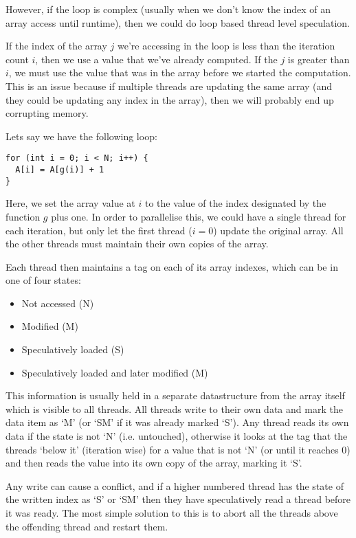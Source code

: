 However, if the loop is complex (usually when we don't know the index
of an array access until runtime), then we could do loop based thread
level speculation.

If the index of the array $j$ we're accessing in the loop is less than
the iteration count $i$, then we use a value that we've already
computed. If the $j$ is greater than $i$, we must use the value that
was in the array before we started the computation. This is an issue
because if multiple threads are updating the same array (and they
could be updating any index in the array), then we will probably end
up corrupting memory.

Lets say we have the following loop:

\begin{verbatim}
for (int i = 0; i < N; i++) {
  A[i] = A[g(i)] + 1
}
\end{verbatim}

Here, we set the array value at $i$ to the value of the index
designated by the function $g$ plus one. In order to parallelise this,
we could have a single thread for each iteration, but only let the
first thread ($i=0$) update the original array. All the other threads
must maintain their own copies of the array.

Each thread then maintains a tag on each of its array indexes, which
can be in one of four states:

\begin{itemize}
\item Not accessed (N)
\item Modified (M)
\item Speculatively loaded (S)
\item Speculatively loaded and later modified (M)
\end{itemize}

This information is usually held in a separate datastructure from the
array itself which is visible to all threads. All threads write to
their own data and mark the data item as `M' (or `SM' if it was
already marked `S'). Any thread reads its own data if the state is not
`N' (i.e. untouched), otherwise it looks at the tag that the threads
`below it' (iteration wise) for a value that is not `N' (or until it
reaches 0) and then reads the value into its own copy of the array,
marking it `S'.

Any write can cause a conflict, and if a higher numbered thread has
the state of the written index as `S' or `SM' then they have
speculatively read a thread before it was ready. The most simple
solution to this is to abort all the threads above the offending
thread and restart them.


